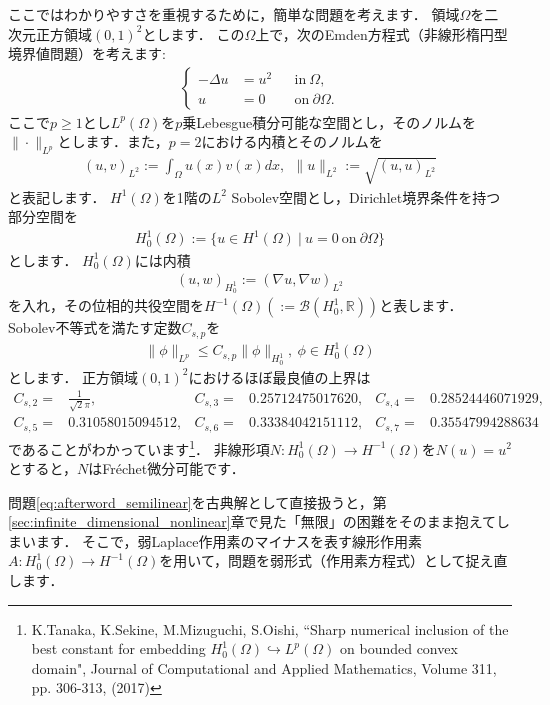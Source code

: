 ここではわかりやすさを重視するために，簡単な問題を考えます．
領域$\Omega$を二次元正方領域$(0,1)^2$とします．
この$\Omega$上で，次のEmden方程式（非線形楕円型境界値問題）を考えます:
\begin{align}
	\left\{
	\begin{aligned}
		-\Delta u &= u^2 && \text{in}~ \Omega, \\
		u &= 0 && \text{on}~ \partial\Omega.
	\end{aligned}
	\right.
	\label{eq:afterword_semilinear}
\end{align}
ここで$p \ge 1$とし$L^p(\Omega)$を$p$乗Lebesgue積分可能な空間とし，そのノルムを$\| \cdot \|_{L^p}$とします．また，$p=2$における内積とそのノルムを
\begin{align*}
	(u, v)_{L^2} := \int_{\Omega} u(x) v(x) dx, ~~ \| u \|_{L^2} := \sqrt{(u, u)_{L^2}}
\end{align*}
と表記します．
$H^1(\Omega)$を1階の$L^2$ Sobolev空間とし，Dirichlet境界条件を持つ部分空間を
\begin{align*}
	H_0^1(\Omega) := \{ u \in H^1(\Omega) ~|~ u = 0 ~\text{on}~ \partial\Omega \}
\end{align*}
とします．
$H_0^1(\Omega)$には内積
\begin{align*}
	(u, w)_{H_0^1} := (\nabla u, \nabla w)_{L^2}
\end{align*}
を入れ，その位相的共役空間を$H^{-1}(\Omega)(:={\mathcal B}(H_0^1, {\mathbb R}))$と表します．
Sobolev不等式を満たす定数$C_{s,p}$を
\begin{align*}
	\| \phi \|_{L^p} \le C_{s,p} \| \phi \|_{H^1_0}, ~ \phi \in H^1_0(\Omega) 
\end{align*}
とします．
正方領域$(0,1)^2$におけるほぼ最良値の上界は
\begin{align*}
C_{s,2} =& \frac{1}{\sqrt{2} \pi}, & C_{s,3} =& 0.25712475017620, & C_{s,4} =& 0.28524446071929, \\ 
C_{s,5} =& 0.31058015094512, & C_{s,6} =& 0.33384042151112, & C_{s,7} =& 0.35547994288634 
\end{align*}
であることがわかっています\footnote{K.Tanaka, K.Sekine, M.Mizuguchi, S.Oishi, ``Sharp numerical inclusion of the best constant for embedding $H^1_0(\Omega) \hookrightarrow L^p (\Omega)$ on bounded convex domain", Journal of Computational and Applied Mathematics, Volume 311, pp. 306-313, (2017)}．
非線形項$N : H_0^1(\Omega) \to H^{-1}(\Omega)$を$N(u) = u^2$とすると，$N$はFr\'echet微分可能です．

問題\eqref{eq:afterword_semilinear}を古典解として直接扱うと，第\ref{sec:infinite_dimensional_nonlinear}章で見た「無限」の困難をそのまま抱えてしまいます．
そこで，弱Laplace作用素のマイナスを表す線形作用素$A : H_0^1(\Omega) \to H^{-1}(\Omega)$を用いて，問題を弱形式（作用素方程式）として捉え直します．

